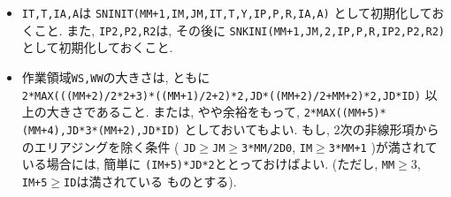 \documentclass[a4j,fleqn]{jarticle}
\begin{document}
\begin{enumerate}
\begin{itemize}
\item {\tt IT,T,IA,A}は 
      {\tt SNINIT(MM+1,IM,JM,IT,T,Y,IP,P,R,IA,A)} として初期化しておくこと.
       また, {\tt IP2,P2,R2}は, その後に
      {\tt SNKINI(MM+1,JM,2,IP,P,R,IP2,P2,R2)} として初期化しておくこと.

\item 作業領域{\tt WS,WW}の大きさは, ともに\\
     {\tt 2*MAX(((MM+2)/2*2+3)*((MM+1)/2+2)*2,JD*((MM+2)/2+MM+2)*2,JD*ID)}
    以上の大きさであること. または, やや余裕をもって,
     {\tt 2*MAX((MM+5)*(MM+4),JD*3*(MM+2),JD*ID)}
    としておいてもよい. もし, 2次の非線形項からのエリアジングを除く条件
     ( {\tt JD}$\ge${\tt JM}$\ge${\tt 3*MM/2D0}, 
      {\tt IM}$\ge${\tt 3*MM+1} )が満されている場合には, 簡単に
      {\tt (IM+5)*JD*2}ととっておけばよい.
     (ただし, {\tt MM}$\ge 3$, {\tt IM+5}$\ge${\tt ID}は満されている
    ものとする).

 \end{itemize}

\end{enumerate}
\end{document}
